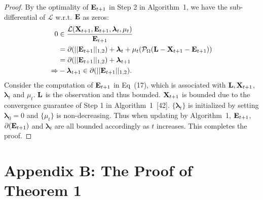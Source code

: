 \documentclass[letterpaper]{article} %
\newtheorem{theorem}{Theorem}
\newcommand\mycomment[1]{}
\def\calP{\mathcal{P}}
\def\bE{{\bf E}}
\def\blambda{{\bm \lambda}}
\def\calL{{\mathcal{L}}}
\def\bL{{\bf L}}
\def\bX{{\bf X}}
\def\bX{{\bf X}}
\begin{document}
\begin{proof}
  By the optimality of $\bE_{t+1}$ in Step 2 in Algorithm~1, we have the sub-differential of $\calL$ w.r.t. $\bE$ as zeros:
  {\small{
  \begin{align}
  \label{eq:derivatives_calL_E}
    0 & \in \frac{\calL(\bX_{t+1}, \bE_{t+1}, \blambda_{t}, \mu_{t})}{\bE_{t+1}} \nonumber \\
      & = \partial(|| \bE_{t+1} ||_{1,2}) + \blambda_{t} + \mu_{t} (\calP_{\Omega} (\bL - \bX_{t+1} - \bE_{t+1})) \nonumber \\
      & = \partial(|| \bE_{t+1} ||_{1,2}) + \blambda_{t+1}   \nonumber \\
    \Rightarrow & -\blambda_{t+1} \in \partial(|| \bE_{t+1} ||_{1,2})  .
  \end{align}
  }}
  \noindent
  Consider the computation of $\bE_{t+1}$ in Eq~(17), which is associated with $\bL, \bX_{t+1}$, $\blambda_{t}$ and $\mu_{t}$.
  $\bL$ is the observation and thus bounded.
  $\bX_{t+1}$ is bounded due to the convergence guarantee of Step 1 in Algorithm~1~[42].
  $\{ \blambda_{t} \}$ is initialized by setting $\blambda_{0} = 0$ and $\{ \mu_{t} \}$ is non-decreasing.
  Thus when updating by Algorithm~1, $\bE_{t+1}$, $\partial(\bE_{t+1})$ and $\blambda_{t}$ are all bounded accordingly as $t$ increases.
  This completes the proof.
\end{proof}



\section{Appendix B: The Proof of Theorem 1}

\mycomment{
\begin{theorem}\label{theorem:alm_convergence}
  Given that the sequence $\{ \blambda_{k} \}$ is bounded, any accumulation point $(\bX^*, \bE^*)$ of Algorithm~1 is a stationary point.
\end{theorem}
}
\end{document}
